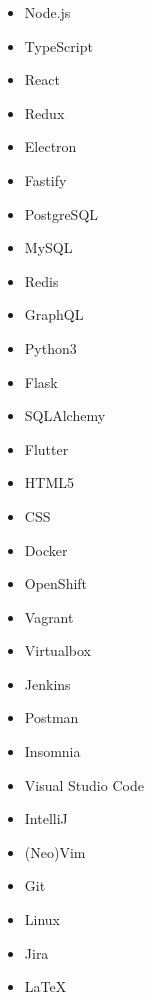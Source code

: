 

\begin{multicols}{4}
	\begin{itemize}
		\item Node.js
		\item TypeScript
		\item React
		\item Redux
		\item Electron
		\item Fastify
		\item PostgreSQL
		\item MySQL
		\item Redis
		\item GraphQL
		\item Python3
		\item Flask
		\item SQLAlchemy
		\item Flutter
		\item HTML5
		\item CSS
		\item Docker
		\item OpenShift
		\item Vagrant
		\item Virtualbox
		\item Jenkins
		\item Postman
		\item Insomnia
		\item Visual Studio Code
		\item IntelliJ
		\item (Neo)Vim
		\item Git
		\item Linux
		\item Jira
		\item LaTeX
	\end{itemize}
\end{multicols}
